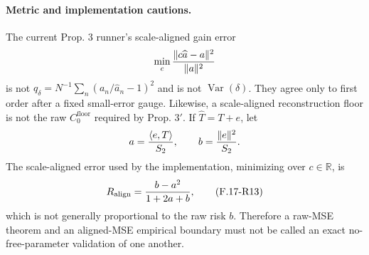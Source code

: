 \paragraph{Metric and implementation cautions.}
The current Prop. 3 runner's scale-aligned gain error
\[
 \min_c{\|c\widehat a-a\|^2\over\|a\|^2}
\]
is not $q_\delta=N^{-1}\sum_n(a_n/\widehat a_n-1)^2$ and is not
$\operatorname{Var}(\delta)$.  They agree only to first order after a
fixed small-error gauge.  Likewise, a scale-aligned reconstruction
floor is not the raw $C_0^{\mathrm{floor}}$ required by Prop. 3$'$.
If $\widehat T=T+e$, let
\[
 a={\langle e,T\rangle\over S_2},\qquad
 b={\|e\|^2\over S_2}.
\]
The scale-aligned error used by the implementation, minimizing over
$c\in\mathbb R$, is
\begin{equation}
 R_{\mathrm{align}}={b-a^2\over1+2a+b}, \tag{F.17-R13}
\end{equation}
which is not generally proportional to the raw risk $b$.  Therefore a
raw-MSE theorem and an aligned-MSE empirical boundary must not be called
an exact no-free-parameter validation of one another.

